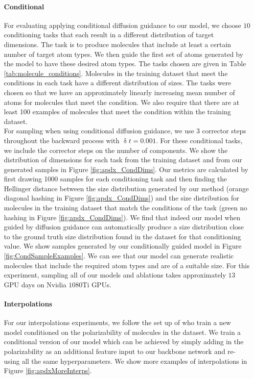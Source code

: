 \paragraph{Conditional}
For evaluating applying conditional diffusion guidance to our model, we choose $10$ conditioning tasks that each result in a different distribution of target dimensions. The task is to produce molecules that include at least a certain number of target atom types. We then guide the first set of atoms generated by the model to have these desired atom types. The tasks chosen are given in Table \ref{tab:molecule_conditions}. Molecules in the training dataset that meet the conditions in each task have a different distribution of sizes. The tasks were chosen so that we have an approximately linearly increasing mean number of atoms for molecules that meet the condition. We also require that there are at least 100 examples of molecules that meet the condition within the training dataset.\\

For sampling when using conditional diffusion guidance, we use $3$ corrector steps throughout the backward process with $\updelta t = 0.001$. For these conditional tasks, we include the corrector steps on the number of components. We show the distribution of dimensions for each task from the training dataset and from our generated samples in Figure \ref{fig:apdx_CondDims}. Our metrics are calculated by first drawing 1000 samples for each conditioning task and then finding the Hellinger distance between the size distribution generated by our method (orange diagonal hashing in Figure \ref{fig:apdx_CondDims}) and the size distribution for molecules in the training dataset that match the conditions of the task (green no hashing in Figure \ref{fig:apdx_CondDims}). We find that indeed our model when guided by diffusion guidance can automatically produce a size distribution close to the ground truth size distribution found in the dataset for that conditioning value. We show samples generated by our conditionally guided model in Figure \ref{fig:CondSampleExamples}. We can see that our model can generate realistic molecules that include the required atom types and are of a suitable size. For this experiment, sampling all of our models and ablations takes approximately $13$ GPU days on Nvidia $1080$Ti GPUs.

\paragraph{Interpolations}
For our interpolations experiments, we follow the set up of \cite{hoogeboom2022equivariant} who train a new model conditioned on the polarizability of molecules in the dataset. We train a conditional version of our model which can be achieved by simply adding in the polarizability as an additional feature input to our backbone network and re-using all the same hyperparameters. We show more examples of interpolations in Figure \ref{fig:apdxMoreInterps}.



